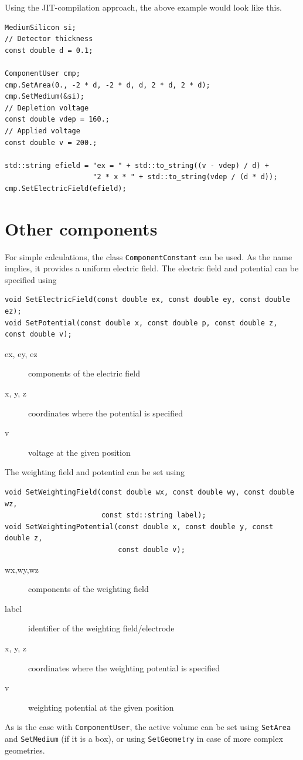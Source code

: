Using the JIT-compilation approach, the above example would look like this.
\begin{lstlisting}
MediumSilicon si;
// Detector thickness
const double d = 0.1;

ComponentUser cmp;
cmp.SetArea(0., -2 * d, -2 * d, d, 2 * d, 2 * d);
cmp.SetMedium(&si);
// Depletion voltage
const double vdep = 160.;
// Applied voltage
const double v = 200.;

std::string efield = "ex = " + std::to_string((v - vdep) / d) + 
                     "2 * x * " + std::to_string(vdep / (d * d));
cmp.SetElectricField(efield);
\end{lstlisting}

\section{Other components}
For simple calculations, the class \texttt{ComponentConstant} can be used. 
As the name implies, it provides a uniform electric field. 
The electric field and potential can be specified using
\begin{lstlisting}
void SetElectricField(const double ex, const double ey, const double ez);
void SetPotential(const double x, const double p, const double z, const double v);
\end{lstlisting}
\begin{description}
  \item[ex, ey, ez]
  components of the electric field
  \item[x, y, z]
  coordinates where the potential is specified
  \item[v]
  voltage at the given position
\end{description}
The weighting field and potential can be set using
\begin{lstlisting}
void SetWeightingField(const double wx, const double wy, const double wz,
                       const std::string label);
void SetWeightingPotential(const double x, const double y, const double z,
                           const double v);
\end{lstlisting}
\begin{description}
  \item[wx,wy,wz] components of the weighting field
  \item[label] identifier of the weighting field/electrode
  \item[x, y, z] coordinates where the weighting potential is specified
  \item[v] weighting potential at the given position 
\end{description}
As is the case with \texttt{ComponentUser}, the active volume can be set using \texttt{SetArea} and \texttt{SetMedium} (if it is a box), or using \texttt{SetGeometry} in case of more complex geometries.

